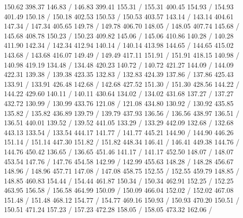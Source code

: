 { 150.62 398.37 146.83 /
 146.83 399.41 155.31 /
 155.31 400.45 154.93 /
 154.93 401.49 150.18 /
 150.18 402.53 150.53 /
 150.53 403.57 143.14 /
 143.14 404.61 147.34 /
 147.34 405.65 149.78 /
 149.78 406.70 148.05 /
 148.05 407.74 145.68 /
 145.68 408.78 150.23 /
 150.23 409.82 145.06 /
 145.06 410.86 140.28 /
 140.28 411.90 142.34 /
 142.34 412.94 140.14 /
 140.14 413.98 144.65 /
 144.65 415.02 143.68 /
 143.68 416.07 149.49 /
 149.49 417.11 151.91 /
 151.91 418.15 140.98 /
 140.98 419.19 134.48 /
 134.48 420.23 140.72 /
 140.72 421.27 144.09 /
 144.09 422.31 139.38 /
 139.38 423.35 132.83 /
 132.83 424.39 137.86 /
 137.86 425.43 133.91 /
 133.91 426.48 142.68 /
 142.68 427.52 151.30 /
 151.30 428.56 144.22 /
 144.22 429.60 140.11 /
 140.11 430.64 134.02 /
 134.02 431.68 137.27 /
 137.27 432.72 130.99 /
 130.99 433.76 121.08 /
 121.08 434.80 130.92 /
 130.92 435.85 135.82 /
 135.82 436.89 139.79 /
 139.79 437.93 136.56 /
 136.56 438.97 136.51 /
 136.51 440.01 139.52 /
 139.52 441.05 133.29 /
 133.29 442.09 132.68 /
 132.68 443.13 133.54 /
 133.54 444.17 141.77 /
 141.77 445.21 144.90 /
 144.90 446.26 151.14 /
 151.14 447.30 151.82 /
 151.82 448.34 146.41 /
 146.41 449.38 144.76 /
 144.76 450.42 136.65 /
 136.65 451.46 141.17 /
 141.17 452.50 148.07 /
 148.07 453.54 147.76 /
 147.76 454.58 142.99 /
 142.99 455.63 148.28 /
 148.28 456.67 148.96 /
 148.96 457.71 147.08 /
 147.08 458.75 152.55 /
 152.55 459.79 148.85 /
 148.85 460.83 154.44 /
 154.44 461.87 150.34 /
 150.34 462.91 152.25 /
 152.25 463.95 156.58 /
 156.58 464.99 150.09 /
 150.09 466.04 152.02 /
 152.02 467.08 151.48 /
 151.48 468.12 154.77 /
 154.77 469.16 150.93 /
 150.93 470.20 150.51 /
 150.51 471.24 157.23 /
 157.23 472.28 158.05 /
 158.05 473.32 162.06 /
}
